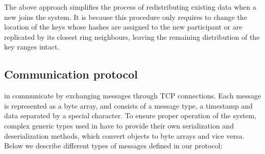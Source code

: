         The above approach simplifies the process of redistributing existing data when a new \Node joins the system. It is because this procedure only requires to change the location of the keys whose hashes are assigned to the new participant or are replicated by its closest ring neighbours, leaving the remaining distribution of the key ranges intact.
        
    \subsection{Communication protocol}
        \Nodes in \DHTS communicate by exchanging messages through TCP connections. Each message is represented as a byte array, and consists of a message type, a timestamp and data separated by a special character. To ensure proper operation of the system, complex generic types used in \PHT have to provide their own serialization and deserialization methods, which convert objects to byte arrays and vice versa. Below we describe different types of messages defined in our protocol: 
